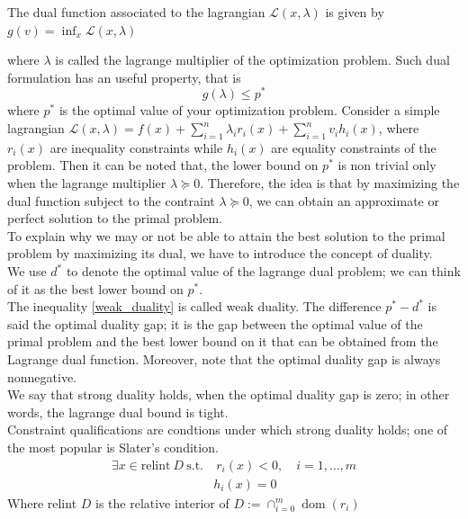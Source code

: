 \begin{definition}
    The dual function associated to the lagrangian $\mathcal{L}(x,\lambda)$ is given by $g(v)=\inf_x \mathcal{L}(x,\lambda)$
\end{definition}
where $\lambda$ is called the lagrange multiplier of the optimization problem. Such dual formulation has an useful property, that is \begin{equation}\label{weak_duality}
    g(\lambda)\leq p^*
\end{equation}
where $p^*$ is the optimal value of your optimization problem.
Consider a simple lagrangian $\mathcal{L}(x,\lambda)=f(x)+\sum\limits_{i=1}^n \lambda_i r_i(x) +\sum\limits_{i=1}^{n} v_i h_i(x)$, where $r_i(x)$ are inequality constraints while $h_i(x)$ are equality constraints of the problem. Then it can be noted that, the lower bound on $p^*$ is non trivial only when the lagrange multiplier $\lambda \succeq 0$. Therefore, the idea is that by maximizing the dual function subject to the contraint $\lambda \succeq 0$, we can obtain an approximate or perfect solution to the primal problem.
\\
To explain why we may or not be able to attain the best solution to the primal problem by maximizing its dual, we have to introduce the concept of duality.
\\
We use $d^*$ to denote the optimal value of the lagrange dual problem; we can think of it as the best lower bound on $p^*$. 
\\
The inequality \ref{weak_duality} is called weak duality. The difference $p^*-d^*$ is said the optimal duality gap; it is the gap between the optimal value of the primal problem and the best lower bound on it that can be obtained from the Lagrange dual function. Moreover, note that the optimal duality gap is always nonnegative.
\\
We say that strong duality holds, when the optimal duality gap is zero; in other words, the lagrange dual bound is tight.
\\
Constraint qualifications are condtions under which strong duality holds; one of the most popular is Slater's condition.
\begin{equation}\label{slater_condition}
    \begin{aligned}
        \exists x \in \textrm{relint} \ D \ \textrm{s.t.} & \ r_i(x)<0, \quad i=1, \dots, m \\
        & h_i(x)=0
    \end{aligned}
\end{equation}
Where relint $D$ is the relative interior of $ D:=\cap _{i=0}^{m}\operatorname {dom} (r_{i})$
